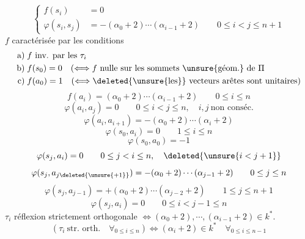 \[
\left\{
\begin{aligned}
f(s_i)&=0\\
\varphi(s_i,s_j)&=-(\alpha_0+2)\cdots(\alpha_{i-1}+2)
\qquad 0\leq i<j\leq n+1
\end{aligned}
\right.
\]
$f$ caractérisée par les conditions
\[
\begin{aligned}
\text{a)}\;&f\ \text{inv. par les }\tau_i\\
\text{b)}\;&f(s_0)=0\quad
(\Longleftrightarrow f\ \text{nulle sur les sommets \unsure{géom.} de }\Pi\\
\text{c)}\;&f(a_0)=1\quad
(\Longleftrightarrow \deleted{\unsure{\text{les}}}\ \text{vecteurs arêtes sont unitaires})
\end{aligned}
\]
\[
f(a_i)=(\alpha_0+2)\cdots(\alpha_{i-1}+2)\qquad0\leq i\leq n
\]
\[
\varphi(a_i,a_j)=0\qquad0\leq i<j\leq n,\quad i,j\ \text{non conséc.}
\]
\[
\varphi(a_i,a_{i+1})=-(\alpha_0+2)\cdots(\alpha_i+2)
\]
\[
\varphi(s_0,a_i)=0\qquad1\leq i\leq n
\]
\[
\varphi(s_0,a_0)=-1
\]
\[
\varphi(s_j,a_i)=0\qquad0\leq j<i\leq n,\quad
\deleted{\unsure{i<j+1}}
\]
\[
\varphi(s_j,a_{j\deleted{\unsure{+1}}})
=-(\alpha_0+2)\cdots(\alpha_{j-1}+2)
\qquad0\leq j\leq n
\]
\[
\varphi(s_j,a_{j-1})=+(\alpha_0+2)\cdots(\alpha_{j-2}+2)
\qquad1\leq j\leq n+1
\]
\[
\varphi(s_j,a_i)=0\qquad0\leq i<j-1\leq n
\]
\margin{
\[
\left\{
\begin{aligned}
\varphi(s_0,s_1)&=\varphi(s_0,a_1)
\inserted{\unsure{=}\varphi(s_0,a_0)=}-1\\
\varphi(s_1,a_0)&=f(a_0)=1\\
\tau_0&\ \text{str. orth.}
\end{aligned}
\right.
\]
}
$\tau_i$ réflexion strictement orthogonale
$\Longleftrightarrow(\alpha_0+2),\cdots,(\alpha_{i-1}+2)\in k^*$.
\[
(\tau_i\ \text{str. orth.}\quad\forall_{0\leq i\leq n})
\Longleftrightarrow(\alpha_i+2)\in k^*\quad\forall_{0\leq i\leq n-1}
\]

